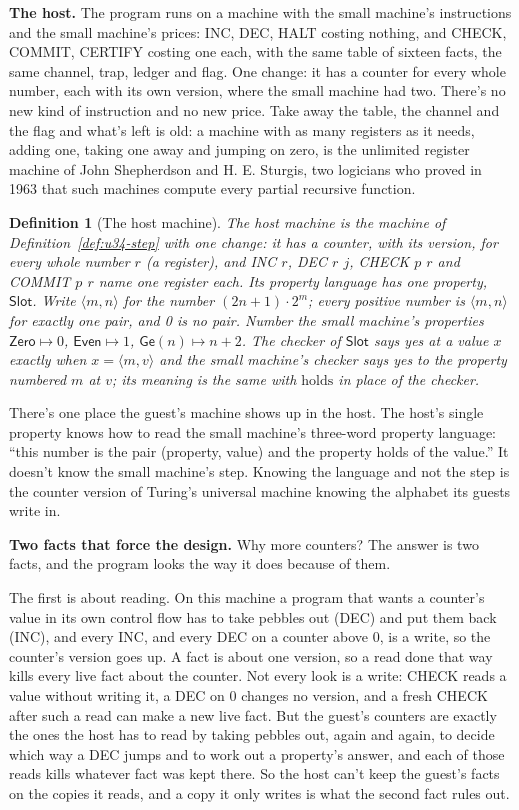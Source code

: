 \documentclass[11pt,twoside]{article}
\theoremstyle{thielethm}
\theoremstyle{thieledef}
\newtheorem{definition}{Definition}[section]
\theoremstyle{thieledef}
\theoremstyle{thieledef}
\theoremstyle{thielethm}
\theoremstyle{thieleobs}
\theoremstyle{thielethm}
\begin{document}
\textbf{The host.} The program runs on a machine with the small machine's instructions and the
small machine's prices: INC, DEC, HALT costing nothing, and CHECK, COMMIT, CERTIFY costing one each, with the
same table of sixteen facts, the same channel, trap, ledger and flag. One change: it has a counter for every whole number,
each with its own version, where the small machine had two. There's no new kind of
instruction and no new price. Take away the table, the channel and the flag and what's left is old: a
machine with as many registers as it needs, adding one, taking one away and jumping on zero, is
the unlimited register machine of John Shepherdson and H. E. Sturgis, two logicians who proved in
1963 that such machines compute every partial recursive function.

\begin{definition}[The host machine]\label{def:u34-multi}
The \emph{host machine} is the machine of Definition~\ref{def:u34-step} with one change: it has a
counter, with its version, for every whole number $r$ (a \emph{register}), and INC $r$, DEC $r$
$j$, CHECK $p$ $r$ and COMMIT $p$ $r$ name one register each. Its property language has one
property, $\mathsf{Slot}$. Write $\langle m, n \rangle$ for the number $(2n + 1)\cdot 2^m$; every
positive number is $\langle m, n \rangle$ for exactly one pair, and 0 is no pair. Number the small
machine's properties $\mathsf{Zero} \mapsto 0$, $\mathsf{Even} \mapsto 1$, $\mathsf{Ge}(n) \mapsto n + 2$.
The checker of $\mathsf{Slot}$ says yes at a value $x$ exactly when $x = \langle m, v \rangle$ and
the small machine's checker says yes to the property numbered $m$ at $v$; its meaning is the same
with $\mathrm{holds}$ in place of the checker.
\end{definition}

There's one place the guest's machine shows up in the host. The host's single property
knows how to read the small machine's three-word property language: ``this number is the pair
(property, value) and the property holds of the value.'' It doesn't know the small machine's
step. Knowing the language and not the step is the counter version of Turing's universal machine
knowing the alphabet its guests write in.

\textbf{Two facts that force the design.} Why more counters? The answer is two facts, and the program
looks the way it does because of them.

The first is about reading. On this machine a program that wants a counter's value in its own
control flow has to take pebbles out (DEC) and put them back (INC), and every INC, and every DEC
on a counter above 0, is a write, so the counter's version goes up. A fact is about one version,
so a read done that way kills every live fact about the counter. Not every look is a write:
CHECK reads a value without writing it, a DEC on 0 changes no version, and a fresh CHECK after
such a read can make a new live fact. But the guest's counters are exactly the ones the host has
to read by taking pebbles out, again and again, to decide which way a DEC jumps and to work out
a property's answer, and each of those reads kills whatever fact was kept there. So the host can't keep the guest's facts on the copies it reads, and a copy it only writes is what the second fact rules out.
\end{document}
